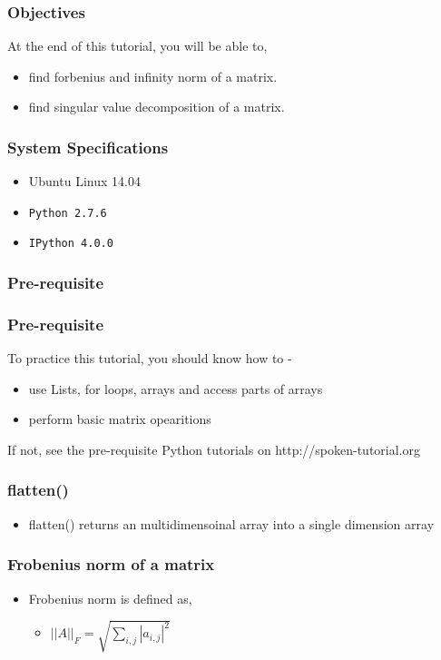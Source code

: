 \documentclass[17pt]{beamer}
\begin{document}
\begin{frame}
\frametitle{Objectives}

  At the end of this tutorial, you will be able to, \pause

\begin{itemize}
	\item find forbenius and infinity norm of a matrix. \pause
	\item find singular value decomposition of a matrix.
\end{itemize}
\end{frame}
\begin{frame}
\frametitle{System Specifications}\pause
\begin{itemize}
\item Ubuntu Linux 14.04\pause
\item \texttt{Python 2.7.6} \pause
\item \texttt{IPython 4.0.0}
\end{itemize}
\end{frame}
\begin{frame}
\frametitle{Pre-requisite}
\frametitle{Pre-requisite}
\label{sec-3}

  To practice this tutorial, you should know how to -\pause

\begin{itemize}
\item use Lists, for loops, arrays and access parts of arrays\pause
\item perform basic matrix opearitions\pause
\end{itemize}
If not, see the pre-requisite Python tutorials on {\color{blue}http://spoken-tutorial.org}
\end{frame}
\begin{frame}[fragile]
\frametitle{flatten()}
\begin{itemize}
\item flatten() returns an multidimensoinal array into a single dimension array
\end{itemize}
\end{frame}
\begin{frame}[fragile]
\frametitle{Frobenius norm of a matrix}
\begin{itemize}
\item Frobenius norm is defined as,
	\begin{itemize}
	\item $||A||_F = \sqrt{\sum_{i,j}|a_{i,j}|^2}$
	\end{itemize}
\end{itemize}
\end{frame}
\end{document}
